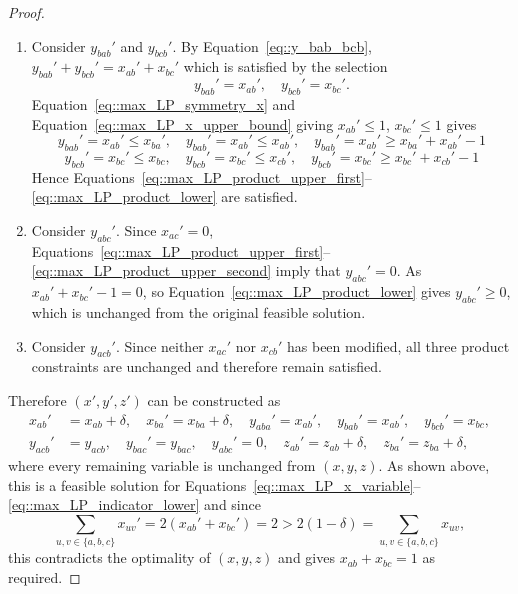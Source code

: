 \begin{proof}
\begin{enumerate}[label=\Alph*.]
\begin{enumerate}[label=(\roman*)]
        \item Consider $y_{bab}'$ and $y_{bcb}'$. By Equation~\eqref{eq::y_bab_bcb}, $y_{bab}'+y_{bcb}'=x_{ab}'+x_{bc}'$ which is satisfied by the selection
          \[
          y_{bab}'=x_{ab}',\quad y_{bcb}'=x_{bc}'. 
          \] 
          Equation~\eqref{eq::max_LP_symmetry_x} and Equation~\eqref{eq::max_LP_x_upper_bound} giving $x_{ab}' \leq 1$, $x_{bc}' \leq 1$ gives
          \[
          y_{bab}'=x_{ab}' \leq x_{ba}',\quad y_{bab}'=x_{ab}'\leq x_{ab}', \quad y_{bab}'=x_{ab}' \geq x_{ba}'+x_{ab}'-1
          \]
          \[
          y_{bcb}'=x_{bc}' \leq x_{bc},\quad y_{bcb}'=x_{bc}' \leq x_{cb}', \quad y_{bcb}'=x_{bc}' \geq x_{bc}'+x_{cb}'-1
          \]
          Hence Equations~\eqref{eq::max_LP_product_upper_first}--\eqref{eq::max_LP_product_lower} are satisfied.
        \item Consider $y_{abc}'$. Since $x_{ac}'=0$, Equations~\eqref{eq::max_LP_product_upper_first}--\eqref{eq::max_LP_product_upper_second} imply that $
          y_{abc}'=0$. As $x_{ab}'+x_{bc}'-1=0$, so Equation~\eqref{eq::max_LP_product_lower} gives $y_{abc}'\ge0$, which is unchanged from the original feasible solution.  
        \item Consider $y_{acb}'$. Since neither $x_{ac}'$ nor $x_{cb}'$ has been modified, all three product constraints are unchanged and therefore remain
        satisfied.
      \end{enumerate}
  \end{enumerate}
  Therefore $(x',y',z')$ can be constructed as 
  \begin{align*}
  x_{ab}'&=x_{ab}+\delta,\quad x_{ba}'=x_{ba}+\delta,\quad y_{aba}'=x_{ab}',\quad y_{bab}'=x_{ab}',\quad y_{bcb}'=x_{bc},\\
  y_{acb}'&=y_{acb},\quad y_{bac}'=y_{bac},\quad  y_{abc}'=0,\quad z_{ab}'=z_{ab}+\delta,\quad z_{ba}'=z_{ba}+\delta,
  \end{align*}
  where every remaining variable is unchanged from $(x,y,z)$. As shown above, this is a feasible solution for Equations~\eqref{eq::max_LP_x_variable}--\eqref{eq::max_LP_indicator_lower} and since
  \[
  \sum_{u,v\in\{a,b,c\}}x_{uv}' = 2(x_{ab}'+x_{bc}') = 2 > 2(1-\delta) = \sum_{u,v\in\{a,b,c\}}x_{uv},
  \]
  this contradicts the optimality of $(x,y,z)$ and gives $x_{ab}+x_{bc}=1$ as required.
\end{proof}

